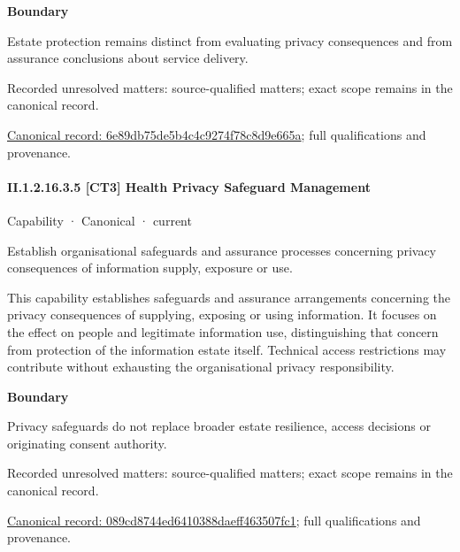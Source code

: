 \textbf{Boundary}



Estate protection remains distinct from evaluating privacy consequences and from assurance conclusions about service delivery.


{\small Recorded unresolved matters: source-qualified matters; exact scope remains in the canonical record.}\par
{\footnotesize \href{../../../../../../../continuum/strategy/capability/6e89db75de5b4c4c9274f78c8d9e665a.md}{Canonical record: 6e89db75de5b4c4c9274f78c8d9e665a}; full qualifications and provenance.}\par
\paragraph*{II.1.2.16.3.5 [CT3] Health Privacy Safeguard Management}
\label{navigation:II.1.2.16.3.5}

\label{element:089cd8744ed6410388daeff463507fc1}
{\small Capability · Canonical · current}\par

Establish organisational safeguards and assurance processes concerning privacy consequences of information supply, exposure or use.



This capability establishes safeguards and assurance arrangements concerning the privacy consequences of supplying, exposing or using information. It focuses on the effect on people and legitimate information use, distinguishing that concern from protection of the information estate itself. Technical access restrictions may contribute without exhausting the organisational privacy responsibility.



\textbf{Boundary}



Privacy safeguards do not replace broader estate resilience, access decisions or originating consent authority.


{\small Recorded unresolved matters: source-qualified matters; exact scope remains in the canonical record.}\par
{\footnotesize \href{../../../../../../../continuum/strategy/capability/089cd8744ed6410388daeff463507fc1.md}{Canonical record: 089cd8744ed6410388daeff463507fc1}; full qualifications and provenance.}\par
